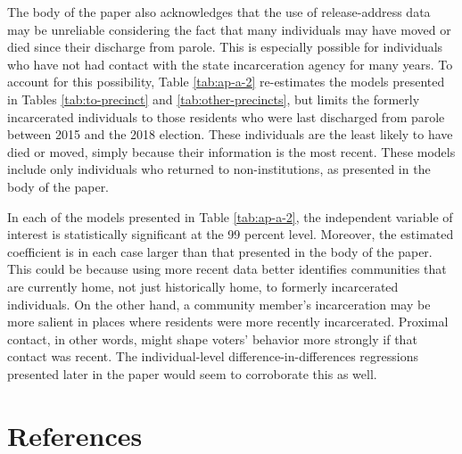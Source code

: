 \documentclass[
  12pt,
]{article}
\begin{document}
The body of the paper also acknowledges that the use of release-address data may be unreliable considering the fact that many individuals may have moved or died since their discharge from parole. This is especially possible for individuals who have not had contact with the state incarceration agency for many years. To account for this possibility, Table \ref{tab:ap-a-2} re-estimates the models presented in Tables \ref{tab:to-precinct} and \ref{tab:other-precincts}, but limits the formerly incarcerated individuals to those residents who were last discharged from parole between 2015 and the 2018 election. These individuals are the least likely to have died or moved, simply because their information is the most recent. These models include only individuals who returned to non-institutions, as presented in the body of the paper.

\begin{singlespace}


\end{singlespace}

In each of the models presented in Table \ref{tab:ap-a-2}, the independent variable of interest is statistically significant at the 99 percent level. Moreover, the estimated coefficient is in each case larger than that presented in the body of the paper. This could be because using more recent data better identifies communities that are currently home, not just historically home, to formerly incarcerated individuals. On the other hand, a community member's incarceration may be more salient in places where residents were more recently incarcerated. Proximal contact, in other words, might shape voters' behavior more strongly if that contact was recent. The individual-level difference-in-differences regressions presented later in the paper would seem to corroborate this as well.

\newpage

\hypertarget{references}{%
\section*{References}\label{references}}
\end{document}
